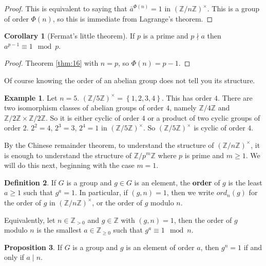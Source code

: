 \documentclass{article}
\newcommand{\Z}{\mathbb{Z}}
\newcommand{\rb}[1]{\left( #1 \right)}
\newcommand{\cb}[1]{\left\{ #1 \right\}}
\newcommand{\unit}[1]{\rb{\Z / #1\Z}^\times}
\theoremstyle{definition}\newtheorem{definition}{Definition}
\theoremstyle{definition}\newtheorem{remark}[definition]{Remark}
\theoremstyle{definition}\newtheorem*{example}{Example}
\theoremstyle{definition}\newtheorem*{note}{Note}
\newtheorem{proposition}[definition]{Proposition}
\newtheorem{corollary}[definition]{Corollary}
\begin{document}
\begin{proof}
This is equivalent to saying that $ \bar{a}^{\Phi\rb{n}} = 1 $ in $ \unit{n} $. This is a group of order $ \Phi\rb{n} $, so this is immediate from Lagrange's theorem.
\end{proof}

\begin{corollary}[Fermat's little theorem]
If $ p $ is a prime and $ p \nmid a $ then $ a^{p - 1} \equiv 1 \mod p $.
\end{corollary}

\begin{proof}
Theorem \ref{thm:16} with $ n = p $, so $ \Phi\rb{n} = p - 1 $.
\end{proof}

Of course knowing the order of an abelian group does not tell you its structure.

\begin{example}
Let $ n = 5 $. $ \unit{5} = \cb{1, 2, 3, 4} $. This has order $ 4 $. There are two isomorphism classes of abelian groups of order $ 4 $, namely $ \Z / 4\Z $ and $ \Z / 2\Z \times \Z / 2\Z $. So it is either cyclic of order $ 4 $ or a product of two cyclic groups of order $ 2 $. $ 2^2 = 4 $, $ 2^3 = 3 $, $ 2^4 = 1 $ in $ \unit{5} $. So $ \unit{5} $ is cyclic of order $ 4 $.
\end{example}

By the Chinese remainder theorem, to understand the structure of $ \unit{n} $, it is enough to understand the structure of $ \Z / p^m\Z $ where $ p $ is prime and $ m \ge 1 $. We will do this next, beginning with the case $ m = 1 $.


\begin{definition}
If $ G $ is a group and $ g \in G $ is an element, the \textbf{order} of $ g $ is the least $ a \ge 1 $ such that $ g^a = 1 $. In particular, if $ \rb{g, n} = 1 $, then we write $ ord_n\rb{g} $ for the order of $ g $ in $ \unit{n} $, or the order of $ g $ modulo $ n $.
\end{definition}

Equivalently, let $ n \in \Z_{> 0} $ and $ g \in \Z $ with $ \rb{g, n} = 1 $, then the order of $ g $ modulo $ n $ is the smallest $ a \in \Z_{\ge 0} $ such that $ g^a \equiv 1 \mod n $.

\begin{proposition}
\label{prop:19}
If $ G $ is a group and $ g $ is an element of order $ a $, then $ g^n = 1 $ if and only if $ a \mid n $.
\end{proposition}
\end{document}
